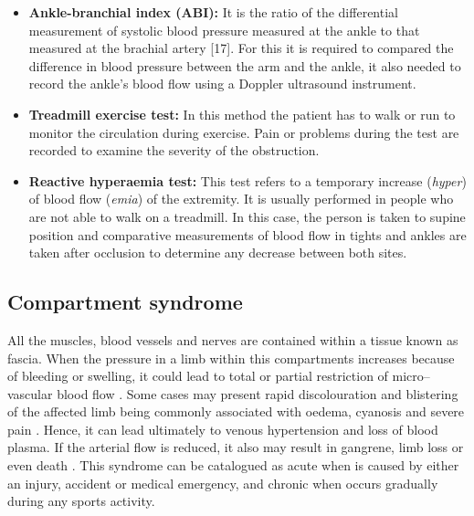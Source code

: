 \begin{itemize}
    \item \textbf{Ankle-branchial index (ABI):} It is the ratio of the differential measurement of systolic blood pressure measured at the ankle to that measured at the brachial artery [17]. For this it is required to compared the difference in blood pressure between the arm and the ankle, it also needed to record the ankle's blood flow using a Doppler ultrasound instrument.  
    \item \textbf{Treadmill exercise test: }In this method the patient has to walk or run to monitor the circulation during exercise. Pain or problems during the test are recorded to examine the severity of the obstruction.
    \item \textbf{Reactive hyperaemia test:} This test refers to a temporary increase (\textit{hyper}) of blood flow (\textit{emia}) of the extremity. It is usually performed in people who are not able to walk on a treadmill. In this case, the person is taken to supine position and comparative measurements of blood flow in tights and ankles are taken after occlusion to determine any decrease between both sites. 
\end{itemize}

\subsection{Compartment syndrome}
\label{section literature 2.2}                                                                                                                                                                                                                                                                                                                                                                                                                                                                                                                                                                                                                     
All the muscles, blood vessels and nerves are contained within a tissue known as fascia. When the pressure in a limb within this compartments increases because of bleeding or swelling, it could lead to total or partial restriction of micro–vascular blood flow \cite{songer2001tissue}. Some cases may present rapid discolouration and blistering of the affected limb being commonly associated with oedema, cyanosis and severe pain \cite{chhabra2013compartment}. Hence, it can lead ultimately to venous hypertension and loss of blood plasma. If the arterial flow is reduced, it also may result in gangrene, limb loss or even death \cite{lamborn2014compartment}. This syndrome can be catalogued as acute when is caused by either an injury, accident or medical emergency, and chronic when occurs gradually during any sports activity.

